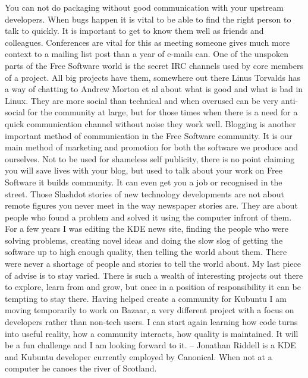 You can not do packaging without good communication with your upstream developers.  When bugs happen it is vital to be able to find the right person to talk to quickly.  It is important to get to know them well as friends and colleagues.  Conferences are vital for this as meeting someone gives much more context to a mailing list post than a year of e-mails can.  
One of the unspoken parts of the Free Software world is the secret IRC channels used by core members of a project.  All big projects have them, somewhere out there Linus Torvalds has a way of chatting to Andrew Morton et al about what is good and what is bad in Linux.  They are more social than technical and when overused can be very anti-social for the community at large, but for those times when there is a need for a quick communication channel without noise they work well.
Blogging is another important method of communication in the Free Software community.  It is our main method of marketing and promotion for both the software we produce and ourselves.  Not to be used for shameless self publicity, there is no point claiming you will save lives with your blog, but used to talk about your work on Free Software it builds community.  It can even get you a job or recognised in the street.
Those Slashdot stories of new technology developments are not about remote figures you never meet in the way newspaper stories are.  They are about people who found a problem and solved it using the computer infront of them.  For a few years I was editing the KDE news site, finding the people who were solving problems, creating novel ideas and doing the slow slog of getting the software up to high enough quality, then telling the world about them.  There were never a shortage of people and stories to tell the world about.  
My last piece of advise is to stay varied.  There is such a wealth of interesting projects out there to explore, learn from and grow, but once in a position of responsibility it can be tempting to stay there.  Having helped create a community for Kubuntu I am moving temporarily to work on Bazaar, a very different project with a focus on developers rather than non-tech users.  I can start again learning how code turns into useful reality, how a community interacts, how quality is maintained.  It will be a fun challenge and I am looking forward to it.
--
Jonathan Riddell is a KDE and Kubuntu developer currently employed by Canonical.  When not at a computer he canoes the river of Scotland.
